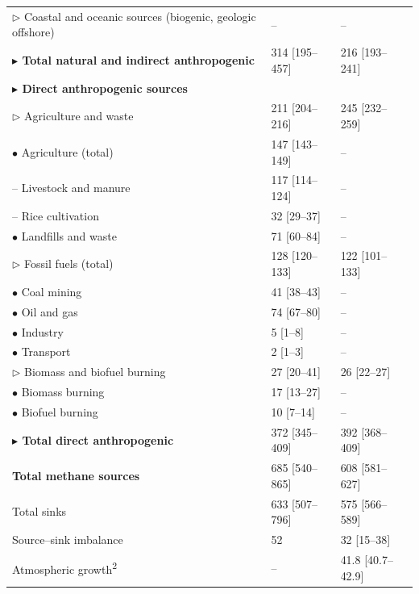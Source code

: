 \begin{longtable}{@{} p{8cm} p{3cm} p{3cm} @{} }
$\triangleright$ Coastal and oceanic sources (biogenic, geologic offshore) & -- & -- \\
\textbf{$\blacktriangleright$ Total natural and indirect anthropogenic} & 314 [195--457] & 216 [193--241] \\
\addlinespace[1.2em]
\textbf{$\blacktriangleright$ Direct anthropogenic sources} & & \\
$\triangleright$ Agriculture and waste & 211 [204--216] & 245 [232--259] \\
\hspace{2em}$\bullet$ Agriculture (total) & 147 [143--149] & -- \\
\hspace{3em}-- Livestock and manure & 117 [114--124] & -- \\
\hspace{3em}-- Rice cultivation & 32 [29--37] & -- \\
\hspace{2em}$\bullet$ Landfills and waste & 71 [60--84] & -- \\
$\triangleright$ Fossil fuels (total) & 128 [120--133] & 122 [101--133] \\
\hspace{2em}$\bullet$ Coal mining & 41 [38--43] & -- \\
\hspace{2em}$\bullet$ Oil and gas & 74 [67--80] & -- \\
\hspace{2em}$\bullet$ Industry & 5 [1--8] & -- \\
\hspace{2em}$\bullet$ Transport & 2 [1--3] & -- \\
$\triangleright$ Biomass and biofuel burning & 27 [20--41] & 26 [22--27] \\
\hspace{2em}$\bullet$ Biomass burning & 17 [13--27] & -- \\
\hspace{2em}$\bullet$ Biofuel burning & 10 [7--14] & -- \\
\textbf{$\blacktriangleright$ Total direct anthropogenic} & 372 [345--409] & 392 [368--409] \\
\addlinespace[1.2em]
\textbf{Total methane sources} & 685 [540--865] & 608 [581--627] \\
Total sinks & 633 [507--796] & 575 [566--589] \\
Source--sink imbalance & 52 & 32 [15--38] \\
Atmospheric growth\textsuperscript{2} & -- & 41.8 [40.7--42.9] \\
\end{longtable}

